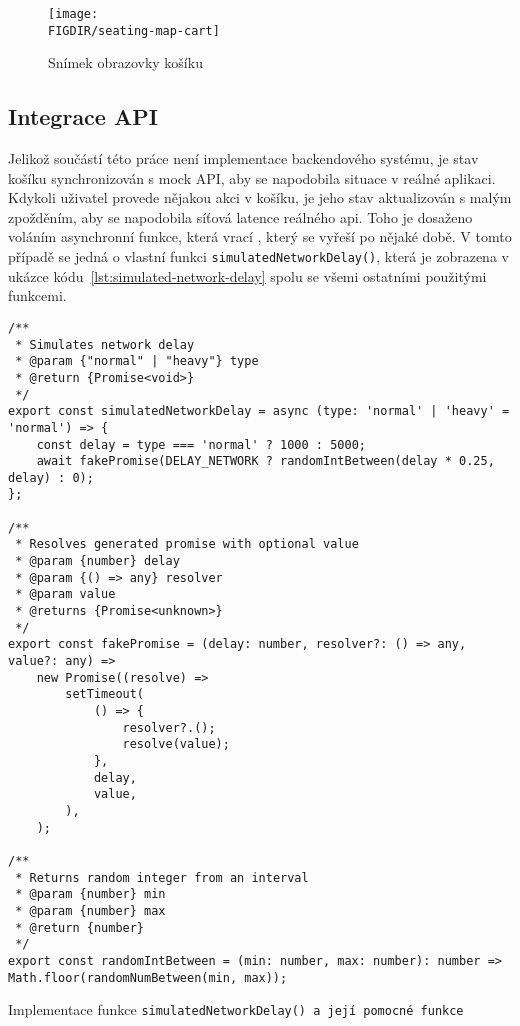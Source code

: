 \begin{figure}[h]
	\centering
	\texttt{[image: \\FIGDIR/seating-map-cart]}
	\caption{Snímek obrazovky košíku}
	\label{fig:seating-map-cart}
\end{figure}

\subsection{Integrace API}
\label{subsec:implementace-kosik-api}
Jelikož součástí této práce není implementace backendového systému, je stav košíku synchronizován s mock API, aby se napodobila situace v reálné aplikaci.
Kdykoli uživatel provede nějakou akci v košíku, je jeho stav aktualizován s malým zpožděním, aby se napodobila síťová latence reálného \ac{api}.
Toho je dosaženo voláním asynchronní funkce, která vrací , který se vyřeší po nějaké době.
V tomto případě se jedná o vlastní funkci \texttt{simulatedNetworkDelay()}, která je zobrazena v ukázce kódu~\ref{lst:simulated-network-delay} spolu se všemi ostatními použitými funkcemi.

\begin{listing}[!h]
\begin{verbatim}
/**
 * Simulates network delay
 * @param {"normal" | "heavy"} type
 * @return {Promise<void>}
 */
export const simulatedNetworkDelay = async (type: 'normal' | 'heavy' = 'normal') => {
	const delay = type === 'normal' ? 1000 : 5000;
	await fakePromise(DELAY_NETWORK ? randomIntBetween(delay * 0.25, delay) : 0);
};

/**
 * Resolves generated promise with optional value
 * @param {number} delay
 * @param {() => any} resolver
 * @param value
 * @returns {Promise<unknown>}
 */
export const fakePromise = (delay: number, resolver?: () => any, value?: any) =>
	new Promise((resolve) =>
		setTimeout(
			() => {
				resolver?.();
				resolve(value);
			},
			delay,
			value,
		),
	);

/**
 * Returns random integer from an interval
 * @param {number} min
 * @param {number} max
 * @return {number}
 */
export const randomIntBetween = (min: number, max: number): number => Math.floor(randomNumBetween(min, max));
\end{verbatim}
\caption{Implementace funkce \texttt{simulatedNetworkDelay() a její pomocné funkce}}
\label{lst:simulated-network-delay}
\end{listing}

